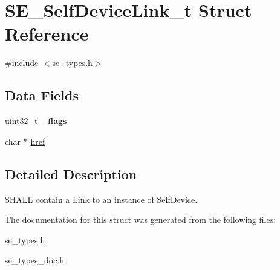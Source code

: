 \hypertarget{structSE__SelfDeviceLink__t}{}\section{S\+E\+\_\+\+Self\+Device\+Link\+\_\+t Struct Reference}
\label{structSE__SelfDeviceLink__t}


{\ttfamily \#include $<$se\+\_\+types.\+h$>$}

\subsection*{Data Fields}
\begin{DoxyCompactItemize}
\item 
uint32\+\_\+t {\bfseries \+\_\+flags}
\item 
char $\ast$ \hyperlink{group__SelfDeviceLink_gaa2cb12576a1aff3304435ed73e86e4e4}{href}
\end{DoxyCompactItemize}


\subsection{Detailed Description}
S\+H\+A\+LL contain a Link to an instance of Self\+Device. 

The documentation for this struct was generated from the following files\+:\begin{DoxyCompactItemize}
\item 
se\+\_\+types.\+h\item 
se\+\_\+types\+\_\+doc.\+h\end{DoxyCompactItemize}
